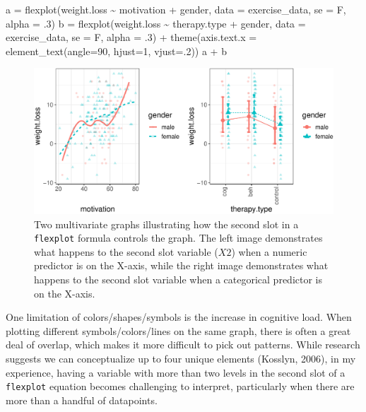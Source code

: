 \documentclass[
  english,
  man]{apa6}
\newenvironment{Shaded}{\begin{snugshade}}{\end{snugshade}}
\newcommand{\AttributeTok}[1]{\textcolor[rgb]{0.77,0.63,0.00}{#1}}
\newcommand{\DecValTok}[1]{\textcolor[rgb]{0.00,0.00,0.81}{#1}}
\newcommand{\FunctionTok}[1]{\textcolor[rgb]{0.00,0.00,0.00}{#1}}
\newcommand{\NormalTok}[1]{#1}
\newcommand{\OtherTok}[1]{\textcolor[rgb]{0.56,0.35,0.01}{#1}}
\newcommand{\SpecialCharTok}[1]{\textcolor[rgb]{0.00,0.00,0.00}{#1}}
\begin{document}
\small

\begin{Shaded}
\begin{Highlighting}[]
\NormalTok{a }\OtherTok{=} \FunctionTok{flexplot}\NormalTok{(weight.loss }\SpecialCharTok{\textasciitilde{}}\NormalTok{ motivation }\SpecialCharTok{+}\NormalTok{ gender, }
    \AttributeTok{data =}\NormalTok{ exercise\_data, }\AttributeTok{se =}\NormalTok{ F, }\AttributeTok{alpha =}\NormalTok{ .}\DecValTok{3}\NormalTok{)}
\NormalTok{b }\OtherTok{=} \FunctionTok{flexplot}\NormalTok{(weight.loss }\SpecialCharTok{\textasciitilde{}}\NormalTok{ therapy.type }\SpecialCharTok{+}\NormalTok{ gender, }
    \AttributeTok{data =}\NormalTok{ exercise\_data, }\AttributeTok{se =}\NormalTok{ F, }\AttributeTok{alpha =}\NormalTok{ .}\DecValTok{3}\NormalTok{) }\SpecialCharTok{+}
    \FunctionTok{theme}\NormalTok{(}\AttributeTok{axis.text.x =} \FunctionTok{element\_text}\NormalTok{(}\AttributeTok{angle=}\DecValTok{90}\NormalTok{, }\AttributeTok{hjust=}\DecValTok{1}\NormalTok{, }\AttributeTok{vjust=}\NormalTok{.}\DecValTok{2}\NormalTok{))}
\NormalTok{a }\SpecialCharTok{+}\NormalTok{ b}
\end{Highlighting}
\end{Shaded}

\begin{figure}
\centering
\includegraphics{flexplot_psychmeth_files/figure-latex/symbols-1.pdf}
\caption{\label{fig:symbols}Two multivariate graphs illustrating how the second slot in a \texttt{flexplot} formula controls the graph. The left image demonstrates what happens to the second slot variable (\(X2\)) when a numeric predictor is on the X-axis, while the right image demonstrates what happens to the second slot variable when a categorical predictor is on the X-axis.}
\end{figure}

\normalsize

One limitation of colors/shapes/symbols is the increase in cognitive load. When plotting different symbols/colors/lines on the same graph, there is often a great deal of overlap, which makes it more difficult to pick out patterns. While research suggests we can conceptualize up to four unique elements (Kosslyn, 2006), in my experience, having a variable with more than two levels in the second slot of a \texttt{flexplot} equation becomes challenging to interpret, particularly when there are more than a handful of datapoints.
\end{document}
